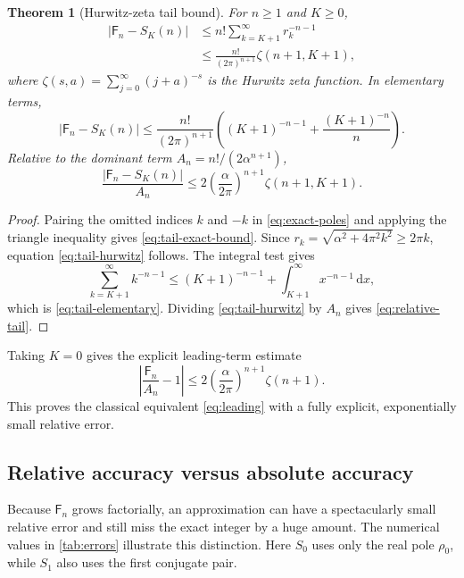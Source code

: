 \documentclass[11pt,a4paper]{article}
\newtheorem{theorem}{Theorem}[section]
\theoremstyle{definition}
\theoremstyle{remark}
\newcommand{\Fub}{\mathsf F}
\newcommand{\dd}{\,\mathrm d}
\newcommand{\abs}[1]{\left|#1\right|}
\begin{document}
\begin{theorem}[Hurwitz-zeta tail bound]\label{thm:tail}
For \(n\ge1\) and \(K\ge0\),
\begin{align}
 \abs{\Fub_n-S_K(n)}
 &\le n!\sum_{k=K+1}^{\infty}r_k^{-n-1}
 \label{eq:tail-exact-bound}\\
 &\le \frac{n!}{(2\pi)^{n+1}}
       \zeta(n+1,K+1),
 \label{eq:tail-hurwitz}
\end{align}
where \(\zeta(s,a)=\sum_{j=0}^{\infty}(j+a)^{-s}\) is the Hurwitz zeta
function.  In elementary terms,
\begin{equation}\label{eq:tail-elementary}
 \abs{\Fub_n-S_K(n)}
 \le \frac{n!}{(2\pi)^{n+1}}
 \left((K+1)^{-n-1}+\frac{(K+1)^{-n}}{n}\right).
\end{equation}
Relative to the dominant term
\(
 A_n=n!/(2\alpha^{n+1})
\),
\begin{equation}\label{eq:relative-tail}
 \frac{\abs{\Fub_n-S_K(n)}}{A_n}
 \le 2\left(\frac{\alpha}{2\pi}\right)^{n+1}
       \zeta(n+1,K+1).
\end{equation}
\end{theorem}

\begin{proof}
Pairing the omitted indices \(k\) and \(-k\) in
\eqref{eq:exact-poles} and applying the triangle inequality gives
\eqref{eq:tail-exact-bound}.  Since
\(
 r_k=\sqrt{\alpha^2+4\pi^2k^2}\ge2\pi k
\), equation \eqref{eq:tail-hurwitz} follows.  The integral test gives
\[
 \sum_{k=K+1}^{\infty}k^{-n-1}
 \le (K+1)^{-n-1}+\int_{K+1}^{\infty}x^{-n-1}\dd x,
\]
which is \eqref{eq:tail-elementary}.  Dividing
\eqref{eq:tail-hurwitz} by \(A_n\) gives \eqref{eq:relative-tail}.
\end{proof}

Taking \(K=0\) gives the explicit leading-term estimate
\begin{equation}\label{eq:leading-bound}
 \abs{\frac{\Fub_n}{A_n}-1}
 \le2\left(\frac{\alpha}{2\pi}\right)^{n+1}\zeta(n+1).
\end{equation}
This proves the classical equivalent \eqref{eq:leading} with a fully explicit,
exponentially small relative error.

\subsection{Relative accuracy versus absolute accuracy}

Because \(\Fub_n\) grows factorially, an approximation can have a spectacularly
small relative error and still miss the exact integer by a huge amount.  The
numerical values in \cref{tab:errors} illustrate this distinction.  Here
\(S_0\) uses only the real pole \(\rho_0\), while \(S_1\) also uses the first
conjugate pair.
\end{document}
